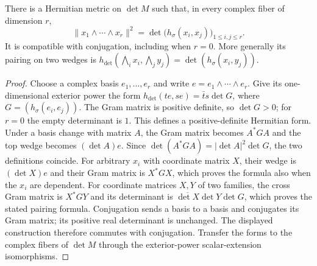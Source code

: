 \begin{lemma}
\label{lem:determinant-metric}
\leanok
There is a Hermitian metric on $\det M$ such that, in every complex
fiber of dimension $r$,
\[
 \|x_1\wedge\cdots\wedge x_r\|^2
   =\det\bigl(h_\sigma(x_i,x_j)\bigr)_{1\le i,j\le r}.
\]
It is compatible with conjugation, including when $r=0$.
More generally its pairing on two wedges is
$h_{\det}(\bigwedge_i x_i,\bigwedge_j y_j)=\det(h_\sigma(x_i,y_j))$.
\end{lemma}
\begin{proof}
Choose a complex basis $e_1,\ldots,e_r$ and write $e=e_1\wedge\cdots\wedge e_r$.
Give its one-dimensional exterior power the form
$h_{\det}(te,se)=\bar t s\det G$, where $G=(h_\sigma(e_i,e_j))$.
The Gram matrix is positive definite, so $\det G>0$; for $r=0$ the
empty determinant is $1$. This defines a positive-definite Hermitian form.
Under a basis change with matrix $A$, the Gram matrix becomes $A^*GA$
and the top wedge becomes $(\det A)e$. Since
$\det(A^*GA)=|\det A|^2\det G$, the two definitions coincide.
For arbitrary $x_i$ with coordinate matrix $X$, their wedge is
$(\det X)e$ and their Gram matrix is $X^*GX$, which proves the formula
also when the $x_i$ are dependent.
For coordinate matrices $X,Y$ of two families, the cross Gram matrix is
$X^*GY$ and its determinant is $\overline{\det X}\det Y\det G$,
which proves the stated pairing formula.
Conjugation sends a basis to a basis and conjugates its Gram matrix;
its positive real determinant is unchanged. The displayed construction
therefore commutes with conjugation. Transfer the forms to the complex
fibers of $\det M$ through the exterior-power scalar-extension isomorphisms.
\end{proof}

